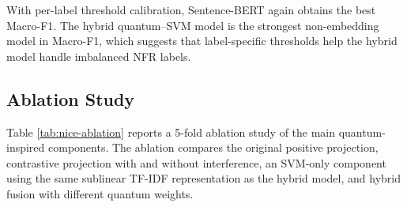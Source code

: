 \documentclass[runningheads]{llncs}
\begin{document}
\begin{table}[htbp]
\centering
\caption{Mean and standard deviation of 5-fold results with per-label threshold calibration on the NICE multi-label dataset. Sentence-BERT has the highest Macro-F1 and LRAP, while the hybrid quantum--SVM model remains the strongest non-embedding model in Macro-F1.}
\label{tab:nice-per-label}
\end{table}

With per-label threshold calibration, Sentence-BERT again obtains the best
Macro-F1. The hybrid quantum--SVM model is the strongest non-embedding model in
Macro-F1, which suggests that label-specific thresholds help the hybrid model
handle imbalanced NFR labels.

\subsection{Ablation Study}
Table \ref{tab:nice-ablation} reports a 5-fold ablation study of the main
quantum-inspired components. The ablation compares the original positive
projection, contrastive projection with and without interference, an SVM-only
component using the same sublinear TF-IDF representation as the hybrid model,
and hybrid fusion with different quantum weights.
\end{document}
